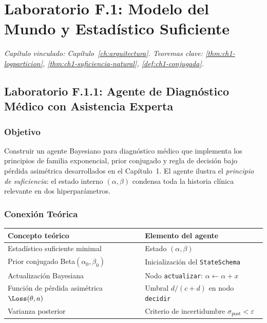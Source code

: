 \section{Laboratorio F.1: Modelo del Mundo y Estadístico Suficiente}
\label{lab:F1}
\textit{Capítulo vinculado: Capítulo~\ref{ch:arquitectura}.
Teoremas clave: \ref{thm:ch1-logparticion}, \ref{thm:ch1-suficiencia-natural},
\ref{def:ch1-conjugada}.}

\bigskip

\subsection*{Laboratorio F.1.1: Agente de Diagnóstico Médico con Asistencia Experta}
\label{lab:F1.1}

\subsubsection*{Objetivo}

Construir un agente Bayesiano para diagnóstico médico que implementa los
principios de familia exponencial, prior conjugado y regla de decisión bajo
pérdida asimétrica desarrollados en el Capítulo~1. El agente ilustra el
\emph{principio de suficiencia}: el estado interno $(\alpha,\beta)$ condensa
toda la historia clínica relevante en dos hiperparámetros.

\subsubsection*{Conexión Teórica}

\begin{center}
\begin{tabular}{@{}ll@{}}
\toprule
\textbf{Concepto teórico} & \textbf{Elemento del agente} \\
\midrule
Estadístico suficiente minimal & Estado $(\alpha,\beta)$ \\
Prior conjugado Beta$(\alpha_0,\beta_0)$ & Inicialización del \texttt{StateSchema} \\
Actualización Bayesiana & Nodo \texttt{actualizar}: $\alpha \leftarrow \alpha+x$ \\
Función de pérdida asimétrica $\Loss(\theta,a)$ & Umbral $d/(c+d)$ en nodo \texttt{decidir} \\
Varianza posterior & Criterio de incertidumbre $\sigma_{\text{post}} < \varepsilon$ \\
\bottomrule
\end{tabular}
\end{center}

